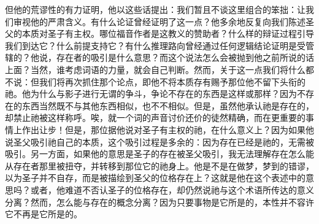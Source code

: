 但他的荒谬性的有力证明，他以这些话提出：我们暂且不谈这里组合的笨拙：让我们审视他的严肃含义。有什么论证曾经证明了这一点？他多余地反复向我们陈述圣父的本质对圣子有主权。哪位福音作者是这教义的赞助者？什么样的辩证过程引导我们到达它？什么前提支持它？有什么推理路向曾经通过任何逻辑结论证明是受管辖的？他说，存在者的吸引是什么意思？而这个说法怎么会被抛到他之前所说的话上面？当然，谁考虑词语的力量，就会自己判断。然而，关于这一点我们将什么都不说：但我们将再次抓住那个论点，即他不将本质存有赐予那位他不留下头衔的祂。他为什么与影子进行无谓的争斗，争论不存在的东西是这样或那样？因为不存在的东西当然既不与其他东西相似，也不不相似。但是，虽然他承认祂是存在的，却禁止祂被这样称呼。唉，就一个词的声音讨价还价的徒然精确，而在更重要的事情上作出让步！但是，那位据他说对圣子有主权的祂，在什么意义上？因为如果他说圣父吸引祂自己的本质，这个吸引过程是多余的：因为存在已经是祂的，无需被吸引。另一方面，如果他的意思是圣子的存在被圣父吸引，我无法理解存在怎么能从存在者那里被扭夺，并转移到那位它的祂身上。他是不是在做梦，梦到的错谬，以为圣子并不自存，而是被描绘到圣父的位格存在上？这就是他在这个表述中的意思吗？或者，他难道不否认圣子的位格存在，却仍然说祂与这个术语所传达的意义分离？然而，怎么能与存在的概念分离？因为只要事物是它所是的，本性并不容许它不再是它所是的。\par



\section{}


